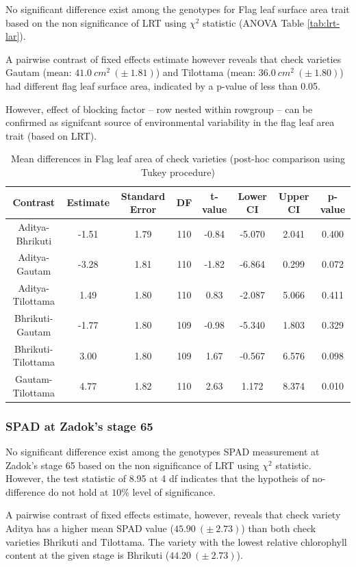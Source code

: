 \documentclass[12pt,oneside]{dukestatscithesis} %
\theoremstyle{definition}
\theoremstyle{definition}
\theoremstyle{definition}
\theoremstyle{remark}
\begin{document}
No significant difference exist among the genotypes for Flag leaf
surface area trait based on the non significance of LRT using \(\chi^2\)
statistic (ANOVA Table \ref{tab:lrt-lar}).

A pairwise contrast of fixed effects estimate however reveals that check
varieties Gautam (mean: \(41.0\ cm^2\ (\pm\ 1.81)\)) and Tilottama
(mean: \(36.0\ cm^2\ (\pm\ 1.80)\)) had different flag leaf surface
area, indicated by a p-value of less than 0.05.

However, effect of blocking factor -- row nested within rowgroup -- can
be confirmed as signifcant source of environmental variability in the
flag leaf area trait (based on LRT).
\begin{table}[H]

\caption{\label{tab:other-meanconf-tab2}Mean differences in Flag leaf area of check varieties (post-hoc comparison using Tukey procedure)}
\centering
\begin{tabular}[t]{cccccccc}
\toprule
Contrast & Estimate & Standard Error & DF & t-value & Lower CI & Upper CI & p-value\\
\midrule
Aditya-Bhrikuti & -1.51 & 1.79 & 110 & -0.84 & -5.070 & 2.041 & 0.400\\
Aditya-Gautam & -3.28 & 1.81 & 110 & -1.82 & -6.864 & 0.299 & 0.072\\
Aditya-Tilottama & 1.49 & 1.80 & 110 & 0.83 & -2.087 & 5.066 & 0.411\\
Bhrikuti-Gautam & -1.77 & 1.80 & 109 & -0.98 & -5.340 & 1.803 & 0.329\\
Bhrikuti-Tilottama & 3.00 & 1.80 & 109 & 1.67 & -0.567 & 6.576 & 0.098\\
Gautam-Tilottama & 4.77 & 1.82 & 110 & 2.63 & 1.172 & 8.374 & 0.010\\
\bottomrule
\end{tabular}
\end{table}
\subsubsection{SPAD at Zadok's stage 65}\label{spad-at-zadoks-stage-65}

No significant difference exist among the genotypes SPAD measurement at
Zadok's stage 65 based on the non significance of LRT using \(\chi^2\)
statistic. However, the test statistic of 8.95 at 4 df indicates that
the hypotheis of no-difference do not hold at \(10\%\) level of
significance.

A pairwise contrast of fixed effects estimate, however, reveals that
check variety Aditya has a higher mean SPAD value
(\(45.90\ (\pm\ 2.73)\)) than both check varieties Bhrikuti and
Tilottama. The variety with the lowest relative chlorophyll content at
the given stage is Bhrikuti (\(44.20\ (\pm\ 2.73)\)).
\end{document}
